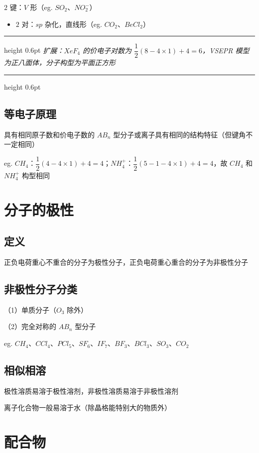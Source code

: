 \documentclass[UTF8,zihao=-4,openany]{ctexbook}
\newenvironment{notebox}
  {\par\smallskip\noindent\begingroup\begin{minipage}{\linewidth}\color{noteframe}\hrule height 0.6pt\smallskip\color{black}\itshape}
  {\par\smallskip\color{noteframe}\hrule height 0.6pt\end{minipage}\endgroup\par\smallskip}
\begin{document}
$2$ 键：$V$ 形（eg. $SO_2$、$NO_2^-$）\par

\begin{itemize}
\item $2$ 对：$sp$ 杂化，直线形（eg. $CO_2$、$BeCl_2$）
\end{itemize}

\begin{notebox}
扩展：$XeF_4$ 的价电子对数为 $\dfrac{1}{2}(8-4\times1)+4=6$，VSEPR 模型为正八面体，分子构型为平面正方形\par
\end{notebox}
\subsection{等电子原理}
具有相同原子数和价电子数的 $AB_n$ 型分子或离子具有相同的结构特征（但键角不一定相同）\par

eg. $CH_4$：$\dfrac{1}{2}(4-4\times1)+4=4$；$NH_4^+$：$\dfrac{1}{2}(5-1-4\times1)+4=4$，故 $CH_4$ 和 $NH_4^+$ 构型相同\par
\section{分子的极性}
\subsection{定义}
正负电荷重心不重合的分子为极性分子，正负电荷重心重合的分子为非极性分子\par
\subsection{非极性分子分类}
（1）单质分子（$O_3$ 除外）\par

（2）完全对称的 $AB_n$ 型分子\par

eg. $CH_4$、$CCl_4$、$PCl_5$、$SF_6$、$IF_7$、$BF_3$、$BCl_3$、$SO_3$、$CO_2$\par
\subsection{相似相溶}
极性溶质易溶于极性溶剂，非极性溶质易溶于非极性溶剂\par

离子化合物一般易溶于水（除晶格能特别大的物质外）\par
\section{配合物}
\end{document}
